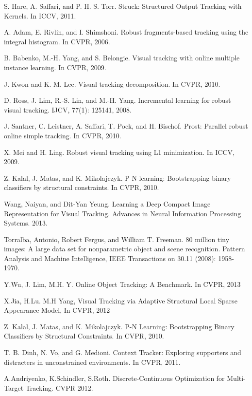 \documentclass{acm_proc_article-sp}
\begin{document}
\begin{thebibliography}{99}
S. Hare, A. Saffari, and P. H. S. Torr. Struck: Structured Output Tracking with Kernels. In ICCV, 2011.

A. Adam, E. Rivlin, and I. Shimshoni. Robust fragments-based tracking using the integral histogram. In CVPR, 2006.

B. Babenko, M.-H. Yang, and S. Belongie. Visual tracking with online multiple instance learning. In CVPR, 2009.

J. Kwon and K. M. Lee. Visual tracking decomposition. In CVPR, 2010.

D. Ross, J. Lim, R.-S. Lin, and M.-H. Yang. Incremental learning for robust visual tracking. IJCV, 77(1): 125141, 2008.

J. Santner, C. Leistner, A. Saffari, T. Pock, and H. Bischof. Prost: Parallel robust online simple tracking. In CVPR, 2010.

X. Mei and H. Ling. Robust visual tracking using L1 minimization. In ICCV, 2009.

Z. Kalal, J. Matas, and K. Mikolajczyk. P-N learning: Bootstrapping binary classifiers by structural constraints. In CVPR, 2010.

Wang, Naiyan, and Dit-Yan Yeung. Learning a Deep Compact Image Representation for Visual Tracking. Advances in Neural Information Processing Systems. 2013.

Torralba, Antonio, Robert Fergus, and William T. Freeman. 80 million tiny images: A large data set for nonparametric object and scene recognition. Pattern Analysis and Machine Intelligence, IEEE Transactions on 30.11 (2008): 1958-1970.

Y.Wu, J. Lim, M.H. Y. Online Object Tracking: A Benchmark. In CVPR, 2013

X.Jia, H.Lu. M.H Yang, Visual Tracking via Adaptive Structural Local Sparse Appearance Model, In CVPR, 2012

Z. Kalal, J. Matas, and K. Mikolajczyk. P-N Learning: Bootstrapping Binary Classifiers by Structural Constraints. In CVPR, 2010.

T. B. Dinh, N. Vo, and G. Medioni. Context Tracker: Exploring supporters and distracters in unconstrained environments. In CVPR, 2011.

A.Andriyenko, K.Schindler, S.Roth. Discrete-Continuous Optimization for Multi-Target Tracking. CVPR 2012.


\end{thebibliography}
\end{document}
